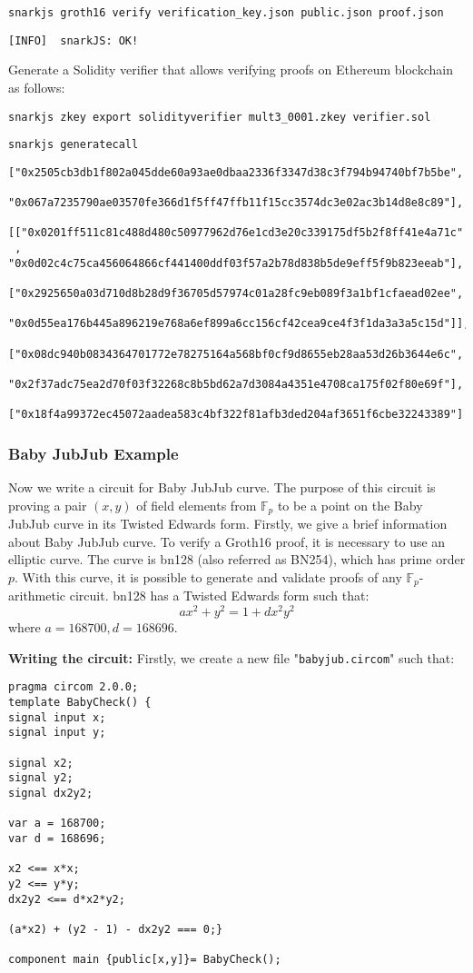\documentclass[a4paper,oneside,12pt]{book}
\begin{document}
\verb|snarkjs groth16 verify verification_key.json public.json proof.json|

\verb|[INFO]  snarkJS: OK!|

\noindent Generate a Solidity verifier that allows verifying proofs on Ethereum blockchain as follows:

\verb|snarkjs zkey export solidityverifier mult3_0001.zkey verifier.sol|

\verb|snarkjs generatecall|

\begin{verbatim}
["0x2505cb3db1f802a045dde60a93ae0dbaa2336f3347d38c3f794b94740bf7b5be",
 "0x067a7235790ae03570fe366d1f5ff47ffb11f15cc3574dc3e02ac3b14d8e8c89"],
 [["0x0201ff511c81c488d480c50977962d76e1cd3e20c339175df5b2f8ff41e4a71c"
 , "0x0d02c4c75ca456064866cf441400ddf03f57a2b78d838b5de9eff5f9b823eeab"],
 ["0x2925650a03d710d8b28d9f36705d57974c01a28fc9eb089f3a1bf1cfaead02ee",
  "0x0d55ea176b445a896219e768a6ef899a6cc156cf42cea9ce4f3f1da3a3a5c15d"]],
  ["0x08dc940b0834364701772e78275164a568bf0cf9d8655eb28aa53d26b3644e6c",
   "0x2f37adc75ea2d70f03f32268c8b5bd62a7d3084a4351e4708ca175f02f80e69f"],
   ["0x18f4a99372ec45072aadea583c4bf322f81afb3ded204af3651f6cbe32243389"]
\end{verbatim}

\subsubsection{Baby JubJub Example}
\noindent Now we write a circuit for Baby JubJub curve. The purpose of this circuit is proving a pair $(x, y)$ of field elements from $\mathbb{F}_p$ to be a point on the Baby JubJub curve in its Twisted Edwards form.
Firstly, we give a brief information about Baby JubJub curve. To verify a Groth16 proof, it is necessary to use an elliptic curve. The curve is bn128 (also referred as BN254), which has prime order $p$. With this curve, it is possible to generate and validate proofs of any $\mathbb{F}_p$-arithmetic circuit. bn128 has a Twisted Edwards form such that:
\[ax^2 + y^2 = 1 + dx^2y^2\] where $a = 168700, d = 168696$.

\noindent \textbf{Writing the circuit:} Firstly, we create a new file "\verb|babyjub.circom|" such that: 

\begin{verbatim}
pragma circom 2.0.0;
template BabyCheck() {
signal input x;
signal input y;

signal x2;
signal y2;
signal dx2y2;

var a = 168700;
var d = 168696;

x2 <== x*x;
y2 <== y*y;
dx2y2 <== d*x2*y2;

(a*x2) + (y2 - 1) - dx2y2 === 0;}

component main {public[x,y]}= BabyCheck();
\end{verbatim}
\end{document}
